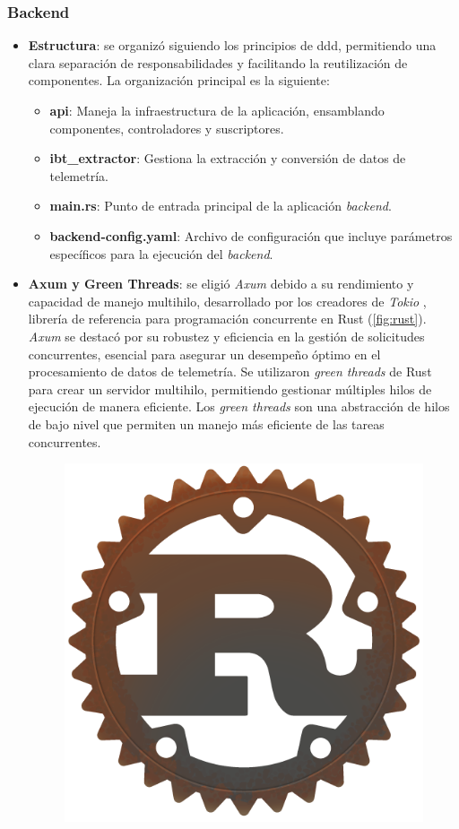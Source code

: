 \subsubsection*{Backend}
\begin{itemize}
    \item \textbf{Estructura}: se organizó siguiendo los principios de \ac{ddd}, permitiendo una clara separación de responsabilidades y facilitando la reutilización de componentes. La organización principal es la siguiente:
    \begin{itemize}
        \item \textbf{api}: Maneja la infraestructura de la aplicación, ensamblando componentes, controladores y suscriptores.
        \item \textbf{ibt\_extractor}: Gestiona la extracción y conversión de datos de telemetría.
        \item \textbf{main.rs}: Punto de entrada principal de la aplicación \textit{backend}.
        \item \textbf{backend-config.yaml}: Archivo de configuración que incluye parámetros específicos para la ejecución del \textit{backend}.
    \end{itemize}
    \item \textbf{Axum y Green Threads}: se eligió \textit{Axum} \cite{axum_github} debido a su rendimiento y capacidad de manejo multihilo, desarrollado por los creadores de \textit{Tokio} \cite{tokio}, librería de referencia para programación concurrente en Rust (\autoref{fig:rust}). \textit{Axum} se destacó por su robustez y eficiencia en la gestión de solicitudes concurrentes, esencial para asegurar un desempeño óptimo en el procesamiento de datos de telemetría. Se utilizaron \textit{green threads} \cite{green_thread} de Rust para crear un servidor multihilo, permitiendo gestionar múltiples hilos de ejecución de manera eficiente. Los \textit{green threads} son una abstracción de hilos de bajo nivel que permiten un manejo más eficiente de las tareas concurrentes.
        \begin{figure}[H]
        	\centering
        	\includegraphics[width=0.3\linewidth]{./figs/herramientas/desarrollo/rust.png}

\end{figure}
\end{itemize}
